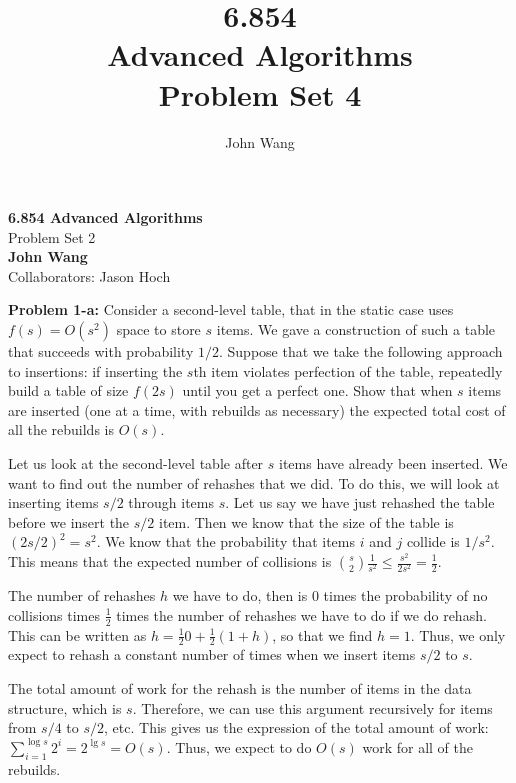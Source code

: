 \documentclass[psamsfonts]{amsart}
\title{6.854 \\
Advanced Algorithms \\
Problem Set 4}
\author{John Wang}
\newenvironment{sol}{\vspace{0.25cm}{\large \bfseries Solution:}}{\qedsymbol}
\newenvironment{prob}[1]{\begin{framed}{\large \bfseries Problem #1:}}{\end{framed}}
\newcommand{\makenewtitle}{
    \begin{center}
    {\huge \bfseries 6.854 Advanced Algorithms} \\
    Problem Set 2\\
    \vspace{0.25cm}
    {\bfseries John Wang} \\
    Collaborators: Jason Hoch
    \end{center}
    \vspace{0.5cm}
}
\begin{document}
\makenewtitle

\begin{prob}{1-a}
Consider a second-level table, that in the static case uses $f(s) = O(s^2)$ space to store $s$ items. We gave a construction of such a table that succeeds with probability $1/2$. Suppose that we take the following approach to insertions: if inserting the $s$th item violates perfection of the table, repeatedly build a table of size $f(2s)$ until you get a perfect one. Show that when $s$ items are inserted (one at a time, with rebuilds as necessary) the expected total cost of all the rebuilds is $O(s)$. 
\end{prob}

\begin{sol}
Let us look at the second-level table after $s$ items have already been inserted. We want to find out the number of rehashes that we did. To do this, we will look at inserting items $s/2$ through items $s$. Let us say we have just rehashed the table before we insert the $s/2$ item. Then we know that the size of the table is $(2s/2)^2 = s^2$. We know that the probability that items $i$ and $j$ collide is $1/s^2$. This means that the expected number of collisions is ${ s \choose 2 } \frac{1}{s^2} \leq \frac{s^2}{2 s^2} = \frac{1}{2}$.

The number of rehashes $h$ we have to do, then is 0 times the probability of no collisions times $\frac{1}{2}$ times the number of rehashes we have to do if we do rehash. This can be written as $h = \frac{1}{2} 0 + \frac{1}{2} ( 1 + h)$, so that we find $h = 1$. Thus, we only expect to rehash a constant number of times when we insert items $s/2$ to $s$. 

The total amount of work for the rehash is the number of items in the data structure, which is $s$. Therefore, we can use this argument recursively for items from $s/4$ to $s/2$, etc. This gives us the expression of the total amount of work: $\sum_{i=1}^{\log s} 2^i = 2^{\lg s} = O(s)$. Thus, we expect to do $O(s)$ work for all of the rebuilds.
\end{sol}
\end{document}
